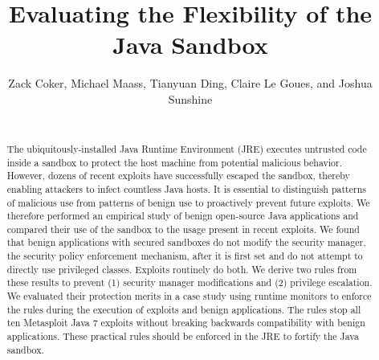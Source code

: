 \documentclass{sig-alternate}
\begin{document}
\lstset{language=Java}

\title{Evaluating the Flexibility of the Java Sandbox}

\author{\alignauthor Zack Coker, Michael Maass, Tianyuan Ding, Claire Le Goues, and Joshua Sunshine \\
 \\
} 

\maketitle
\thispagestyle{plain} 
\pagestyle{plain}
\begin{abstract}
The ubiquitously-installed Java Runtime Environment (JRE) executes
untrusted code inside a sandbox to protect the host machine from potential
malicious behavior. However, dozens of recent exploits have successfully
escaped the sandbox, thereby enabling attackers to infect countless
Java hosts. It is essential to distinguish patterns of malicious use
from patterns of benign use to proactively prevent future exploits.
We therefore performed an empirical study of benign open-source Java
applications and compared their use of the sandbox to the usage present
in recent exploits. We found that benign applications with secured
sandboxes do not modify the security manager, the security policy
enforcement mechanism, after it is first set and do not attempt to
directly use privileged classes. Exploits routinely do both. We derive 
two rules from these results to prevent (1) security manager 
modifications and (2) privilege escalation. We evaluated their protection merits 
in a case study using runtime monitors to enforce the rules during the 
execution of exploits and benign applications. The rules stop all ten 
Metasploit Java 7 exploits without breaking backwards compatibility 
with benign applications. These practical rules should be enforced 
in the JRE to fortify the Java sandbox.
\end{abstract}
\end{document}
